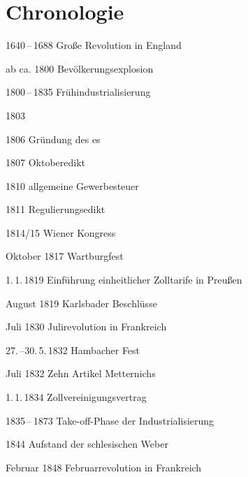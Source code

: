 \chapter{Chronologie}\label{cap:Chronik}

\begin{chronik}
\item[1640\,--\,1688]
Große Revolution in England

\item[ab ca. 1800]
Bevölkerungsexplosion

\item[1800\,--\,1835]
Frühindustrialisierung

\item[1803]

\item[1806]
Gründung des es

\item[1807]
Oktoberedikt

\item[1810]
allgemeine Gewerbesteuer

\item[1811]
Regulierungsedikt

\item[1814/15]
Wiener Kongress

\item[Oktober 1817]
Wartburgfest

\item[1.\,1.\,1819]
Einführung einheitlicher Zolltarife in Preußen

\item[August 1819]
Karlsbader Beschlüsse

\item[Juli 1830]
Julirevolution in Frankreich

\item[27.\,--30.\,5.\,1832]
Hambacher Fest

\item[Juli 1832]
Zehn Artikel Metternichs

\item[1.\,1.\,1834]
Zollvereinigungsvertrag

\item[1835\,--\,1873]
Take-off-Phase der Industrialisierung

\item[1844]
Aufstand der schlesischen Weber

\item[Februar 1848]
Februarrevolution in Frankreich


\end{chronik}
